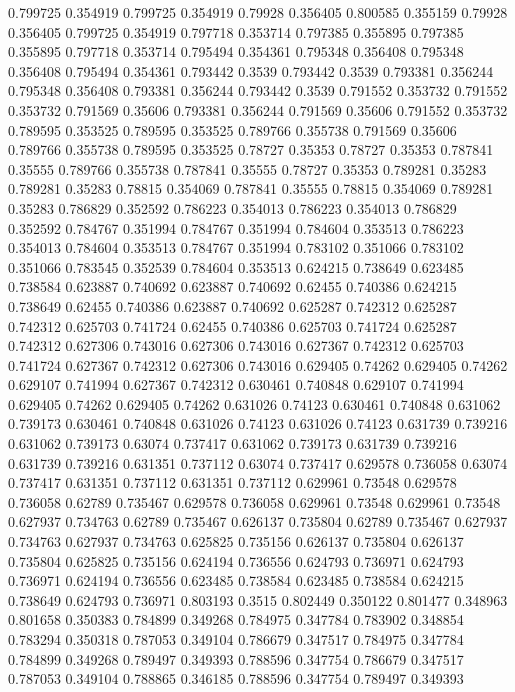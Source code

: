 0.799725 0.354919
0.799725 0.354919
0.79928 0.356405
0.800585 0.355159
0.79928 0.356405
0.799725 0.354919
0.797718 0.353714
0.797385 0.355895
0.797385 0.355895
0.797718 0.353714
0.795494 0.354361
0.795348 0.356408
0.795348 0.356408
0.795494 0.354361
0.793442 0.3539
0.793442 0.3539
0.793381 0.356244
0.795348 0.356408
0.793381 0.356244
0.793442 0.3539
0.791552 0.353732
0.791552 0.353732
0.791569 0.35606
0.793381 0.356244
0.791569 0.35606
0.791552 0.353732
0.789595 0.353525
0.789595 0.353525
0.789766 0.355738
0.791569 0.35606
0.789766 0.355738
0.789595 0.353525
0.78727 0.35353
0.78727 0.35353
0.787841 0.35555
0.789766 0.355738
0.787841 0.35555
0.78727 0.35353
0.789281 0.35283
0.789281 0.35283
0.78815 0.354069
0.787841 0.35555
0.78815 0.354069
0.789281 0.35283
0.786829 0.352592
0.786223 0.354013
0.786223 0.354013
0.786829 0.352592
0.784767 0.351994
0.784767 0.351994
0.784604 0.353513
0.786223 0.354013
0.784604 0.353513
0.784767 0.351994
0.783102 0.351066
0.783102 0.351066
0.783545 0.352539
0.784604 0.353513
0.624215 0.738649
0.623485 0.738584
0.623887 0.740692
0.623887 0.740692
0.62455 0.740386
0.624215 0.738649
0.62455 0.740386
0.623887 0.740692
0.625287 0.742312
0.625287 0.742312
0.625703 0.741724
0.62455 0.740386
0.625703 0.741724
0.625287 0.742312
0.627306 0.743016
0.627306 0.743016
0.627367 0.742312
0.625703 0.741724
0.627367 0.742312
0.627306 0.743016
0.629405 0.74262
0.629405 0.74262
0.629107 0.741994
0.627367 0.742312
0.630461 0.740848
0.629107 0.741994
0.629405 0.74262
0.629405 0.74262
0.631026 0.74123
0.630461 0.740848
0.631062 0.739173
0.630461 0.740848
0.631026 0.74123
0.631026 0.74123
0.631739 0.739216
0.631062 0.739173
0.63074 0.737417
0.631062 0.739173
0.631739 0.739216
0.631739 0.739216
0.631351 0.737112
0.63074 0.737417
0.629578 0.736058
0.63074 0.737417
0.631351 0.737112
0.631351 0.737112
0.629961 0.73548
0.629578 0.736058
0.62789 0.735467
0.629578 0.736058
0.629961 0.73548
0.629961 0.73548
0.627937 0.734763
0.62789 0.735467
0.626137 0.735804
0.62789 0.735467
0.627937 0.734763
0.627937 0.734763
0.625825 0.735156
0.626137 0.735804
0.626137 0.735804
0.625825 0.735156
0.624194 0.736556
0.624793 0.736971
0.624793 0.736971
0.624194 0.736556
0.623485 0.738584
0.623485 0.738584
0.624215 0.738649
0.624793 0.736971
0.803193 0.3515
0.802449 0.350122
0.801477 0.348963
0.801658 0.350383
0.784899 0.349268
0.784975 0.347784
0.783902 0.348854
0.783294 0.350318
0.787053 0.349104
0.786679 0.347517
0.784975 0.347784
0.784899 0.349268
0.789497 0.349393
0.788596 0.347754
0.786679 0.347517
0.787053 0.349104
0.788865 0.346185
0.788596 0.347754
0.789497 0.349393
